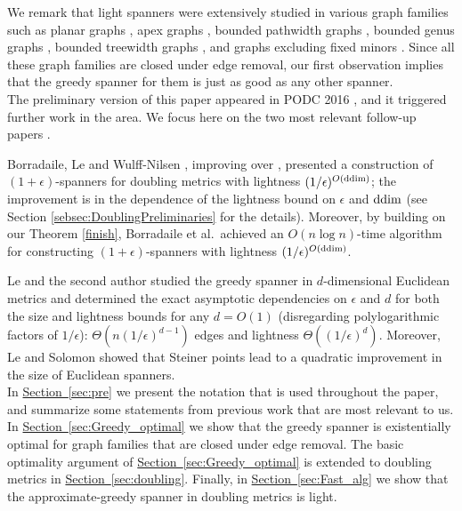 \documentclass[11pt,letterpaper]{article}
\newcommand{\ddim}{{\rm ddim}}
\newcommand{\eps}{\epsilon}
\newcommand{\namedref}[2]{\hyperref[#2]{#1~\ref*{#2}}}
\newcommand{\sectionref}[1]{\namedref{Section}{#1}}
\begin{document}
We remark that light spanners were extensively studied in various graph families such as planar graphs \cite{ADDJS93,Klein05}, apex graphs \cite{GS02},
bounded pathwidth graphs \cite{GH12}, bounded genus graphs \cite{Grigni00,GS02,DHM10}, bounded treewidth graphs \cite{DHM10},
and graphs excluding fixed minors \cite{Grigni00,DHM10,BLW17Minor}.
Since all these graph families are closed under edge removal, our first observation implies that the greedy spanner for them is just as good as any other spanner.
\vspace{6pt}
\\
The preliminary version of this paper appeared in PODC 2016 \cite{FS16}, and it triggered further work in the area.
We focus here on the two most relevant follow-up papers \cite{BLW19,LS19}. 

Borradaile, Le and Wulff{-}Nilsen \cite{BLW19}, improving over  \cite{Got15}, presented a construction of $(1+\eps)$-spanners for doubling metrics with lightness 
$(1/\eps)^{O(\ddim)}$; the improvement is in the dependence of the lightness bound on $\eps$ and $\ddim$ (see Section \ref{sebsec:DoublingPreliminaries} for the details).
Moreover, by building on our Theorem \ref{finish}, Borradaile et al.\  achieved an $O(n \log n)$-time algorithm for constructing $(1+\eps)$-spanners with lightness $(1/\eps)^{O(\ddim)}$.

Le and the second author \cite{LS19} studied the greedy spanner in $d$-dimensional Euclidean metrics and determined the exact asymptotic dependencies on $\eps$ and $d$ for 
both the size and lightness bounds for any $d = O(1)$ (disregarding polylogarithmic factors of $1/\eps$): $\Theta(n(1/\eps)^{d-1})$ edges and lightness $\Theta((1/\eps)^{d})$.
Moreover, Le and Solomon \cite{LS19} showed that Steiner points lead to a quadratic improvement in the size of Euclidean spanners.
\vspace{6pt}
\\
In \sectionref{sec:pre} we present the notation that is used throughout the paper, and summarize some statements from previous work that are most relevant to us.
In \sectionref{sec:Greedy_optimal} we show that the greedy spanner is existentially optimal for graph families that are closed under edge removal.
The basic optimality argument of \sectionref{sec:Greedy_optimal} is extended to doubling metrics in \sectionref{sec:doubling}.
Finally, in \sectionref{sec:Fast_alg} we show that the approximate-greedy spanner in doubling metrics is light.
\end{document}
